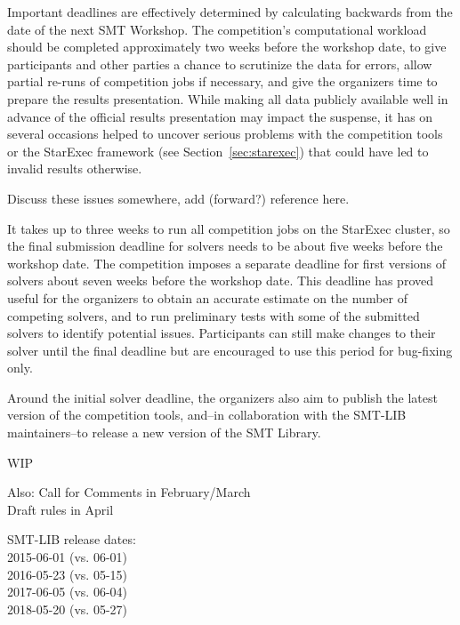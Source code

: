 \documentclass[twoside,11pt]{article}
\begin{document}
Important deadlines are effectively determined by calculating
backwards from the date of the next SMT Workshop.  The competition's
computational workload should be completed approximately two weeks
before the workshop date, to give participants and other parties a
chance to scrutinize the data for errors, allow partial re-runs of
competition jobs if necessary, and give the organizers time to prepare
the results presentation.  While making all data publicly available
well in advance of the official results presentation may impact the
suspense, it has on several occasions helped to uncover serious
problems with the competition tools or the StarExec framework (see
Section~\ref{sec:starexec}) that could have led to invalid results
otherwise.
\begin{tjark}
  Discuss these issues somewhere, add (forward?) reference here.
\end{tjark}

It takes up to three weeks to run all competition jobs on the StarExec
cluster, so the final submission deadline for solvers needs to be
about five weeks before the workshop date.  The competition imposes a
separate deadline for first versions of solvers about seven weeks
before the workshop date.  This deadline has proved useful for the
organizers to obtain an accurate estimate on the number of competing
solvers, and to run preliminary tests with some of the submitted
solvers to identify potential issues.  Participants can still make
changes to their solver until the final deadline but are encouraged to
use this period for bug-fixing only.

Around the initial solver deadline, the organizers also aim to publish
the latest version of the competition tools, and--in collaboration
with the SMT-LIB maintainers--to release a new version of the SMT
Library.

\begin{tjark}
  WIP

  Also: Call for Comments in February/March\\
  Draft rules in April
   
  SMT-LIB release dates:\\
  2015-06-01 (vs. 06-01)\\
  2016-05-23 (vs. 05-15)\\
  2017-06-05 (vs. 06-04)\\
  2018-05-20 (vs. 05-27)
\end{tjark}

\end{document}
